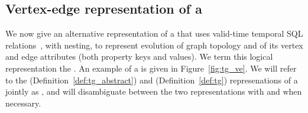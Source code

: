 \subsection{Vertex-edge representation of a \tg}
\label{sec:model:ve}

We now give an alternative representation of a \tg that uses
valid-time temporal SQL relations~\cite{DBLP:conf/vldb/BohlenSS96},
with nesting, to represent evolution of graph topology and of its
vertex and edge attributes (both property keys and values).  We term
this logical representation the {\em \ve \tg}.  An example of a \ve
\tg is given in Figure~\ref{fig:tg_ve}.  We will refer to the \rgs
(Definition~\ref{def:tg_abstract}) and \ve (Definition~\ref{def:tg})
represenations of a \tg jointly as , and will disambiguate
between the two representations with \trg and \tve when necessary.


